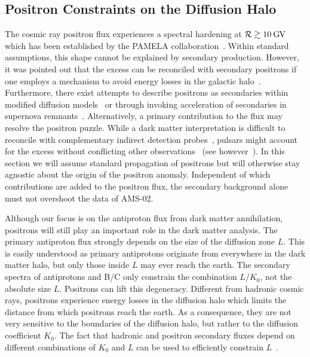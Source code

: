 \documentclass[a4paper,11pt]{article}
\newcommand{\eVdist}{\kern-0.06em}
\newcommand{\gv}{\:\text{G\eVdist V}}
\newcommand{\R}{\mathcal{R}}
\begin{document}
\subsection{Positron Constraints on the Diffusion Halo}\label{sec:positron}

The cosmic ray positron flux experiences a spectral hardening at $\R \gtrsim 10 \gv$ which has been established by the PAMELA collaboration~\cite{Adriani:2008zr}. Within standard assumptions, this shape cannot be explained by secondary production. However, it was pointed out that the excess can be reconciled with secondary positrons if one employs a mechanism to avoid energy losses in the galactic halo~\cite{Katz:2009yd,Blum:2013zsa,Lipari:2016vqk,Blum:2017iwq}. Furthermore, there exist attempts to describe positrons as secondaries within modified diffusion models~\cite{Cowsik:2013woa,Kappl:2016qug} or through invoking acceleration of secondaries in supernova remnants~\cite{Blasi:2009hv,Mertsch:2009ph,Mertsch:2014poa}. Alternatively, a primary contribution to the flux may resolve the positron puzzle. While a dark matter interpretation is difficult to reconcile with complementary indirect detection probes~\cite{Abdo:2010dk,Ackermann:2011wa,Galli:2009zc,Slatyer:2009yq,Huetsi:2009ex}, pulsars might account for the excess without conflicting other observations~\cite{Aharonian:1995zz,Hooper:2008kg} (see however~\cite{Abeysekara:2017old}).
In this section we will assume standard propagation of positrons but will otherwise stay agnostic about the origin of the positron anomaly. Independent of which contributions are added to the positron flux, the secondary background alone must not overshoot the data of AMS-02. 

Although our focus is on the antiproton flux from dark matter annihilation, positrons will still play an important role in the dark matter analysis. The primary antiproton flux strongly depends on the size of the diffusion zone $L$. This is easily understood as primary antiprotons originate from everywhere in the dark matter halo, but only those inside $L$ may ever reach the earth. The secondary spectra of antiprotons and B/C only constrain the combination $L/K_0$, not the absolute size $L$. Positrons can lift this degeneracy. Different from hadronic cosmic rays, positrons experience energy losses in the diffusion halo which limits the distance from which positrons reach the earth. As a consequence, they are not very sensitive to the boundaries of the diffusion halo, but rather to the diffusion coefficient $K_0$. The fact that hadronic and positron secondary fluxes depend on different combinations of $K_0$ and $L$ can be used to efficiently constrain $L$~\cite{Lavalle:2014kca,Boudaud:2016jvj}. 
\end{document}
